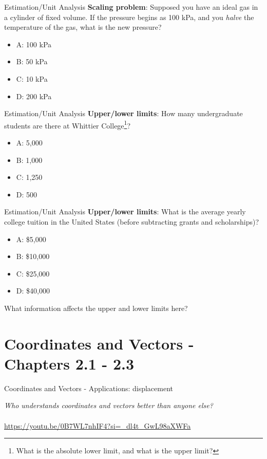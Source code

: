 \documentclass{beamer}
\begin{document}
\begin{frame}{Estimation/Unit Analysis}
\textbf{Scaling problem}: Supposed you have an ideal gas in a cylinder of fixed volume.  If the pressure begins as 100 kPa, and you \textit{halve} the temperature of the gas, what is the new pressure?
\begin{itemize}
\item A: 100 kPa
\item B: 50 kPa
\item C: 10 kPa
\item D: 200 kPa
\end{itemize}
\end{frame}

\begin{frame}{Estimation/Unit Analysis}
\textbf{Upper/lower limits}: How many undergraduate students are there at Whittier College\footnote{What is the absolute lower limit, and what is the upper limit?}?
\begin{itemize}
\item A: 5,000
\item B: 1,000
\item C: 1,250
\item D: 500
\end{itemize}
\end{frame}

\begin{frame}{Estimation/Unit Analysis}
\textbf{Upper/lower limits}: What is the average yearly college tuition in the United States (before subtracting grants and scholarships)?
\begin{itemize}
\item A: \$5,000
\item B: \$10,000
\item C: \$25,000
\item D: \$40,000
\end{itemize}
What information affects the \alert{upper} and \alert{lower} limits here?
\end{frame}

\section{Coordinates and Vectors - Chapters 2.1 - 2.3}

\begin{frame}{Coordinates and Vectors - Applications: displacement}
\begin{tcolorbox}[colback=white,colframe=gray,title=Activity Link]
\textit{Who understands coordinates and vectors better than anyone else?} \\ \\
\url{https://youtu.be/0B7WL7nhIF4?si=_dl4t_GwL98aXWFa}
\end{tcolorbox}
\end{frame}
\end{document}
